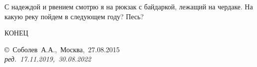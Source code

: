 С надеждой и рвением смотрю я на рюкзак с байдаркой, лежащий на чердаке. На какую реку пойдем в следующем году? Песь?
\begin{center}
\end{center}

\begin{center}
	\Large {КОНЕЦ}
\end{center}
\vspace{\fill}
\begin{flushright}
	\copyright~Соболев~А.А.,~Москва,~27.08.2015\\
	\textit{ред.~17.11.2019,~30.08.2022}
\end{flushright}




